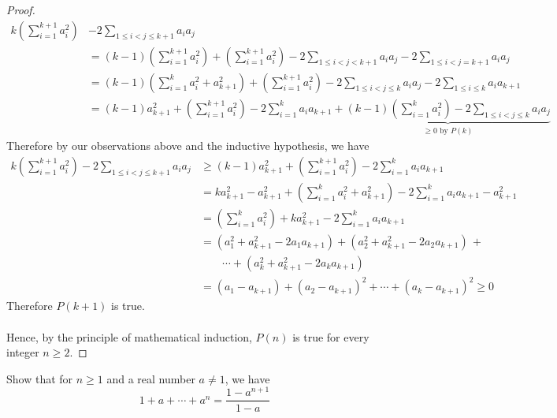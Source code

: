 \begin{proof}
\begin{align*}
k\left(\sum_{i=1}^{k+1} a_i^2 \right)& - 2 \sum_{1\leq i < j \leq k+1}a_ia_j\\[1em]
 &= (k-1)\left(\sum_{i=1}^{k+1} a_i^2 \right) + \left(\sum_{i=1}^{k+1} a_i^2 \right) - 2 \sum_{1\leq i < j < k+1}a_ia_j - 2 \sum_{1\leq i < j = k+1}a_ia_j\\[1em]
 &= (k-1)\left(\sum_{i=1}^{k} a_i^2 + a_{k+1}^2 \right) + \left(\sum_{i=1}^{k+1} a_i^2 \right) - 2 \sum_{1\leq i < j \leq k}a_ia_j - 2 \sum_{1\leq i \leq k}a_ia_{k+1}\\[1em]
 &= (k-1)a_{k+1}^2 + \left(\sum_{i=1}^{k+1} a_i^2 \right) - 2 \sum_{i=1}^{k}a_ia_{k+1} + \underbrace{(k-1)\left(\sum_{i=1}^{k} a_i^2 \right)- 2 \sum_{1\leq i < j \leq k}a_ia_j}_{\text{$\geq 0$ by $P(k)$}}
\end{align*}
Therefore by our observations above and the inductive hypothesis, we have
\begin{align*}
k\left(\sum_{i=1}^{k+1} a_i^2 \right) - 2 \sum_{1\leq i < j \leq k+1}a_ia_j & \geq (k-1)a_{k+1}^2 + \left(\sum_{i=1}^{k+1} a_i^2 \right) - 2 \sum_{i=1}^{k}a_ia_{k+1}\\[1em]
 &= ka_{k+1}^2 - a_{k+1}^2 + \left(\sum_{i=1}^{k} a_i^2 + a_{k+1}^2 \right) - 2 \sum_{i=1}^{k}a_ia_{k+1} - a_{k+1}^2\\[1em]
 &= \left(\sum_{i=1}^{k} a_i^2 \right)+ka_{k+1}^2 - 2 \sum_{i=1}^{k}a_ia_{k+1}\\[1em]
 &= (a_1^2 + a_{k+1}^2 - 2a_1a_{k+1}) + (a_2^2 + a_{k+1}^2 - 2a_2a_{k+1}) \,+\\ &\qquad\cdots + (a_k^2 + a_{k+1}^2 - 2a_ka_{k+1})\\[1em]
 &= (a_1 - a_{k+1}) + (a_2 - a_{k+1})^2 + \cdots + (a_k - a_{k+1})^2 \geq 0
\end{align*}
Therefore $P(k+1)$ is true.\\
\\
Hence, by the principle of mathematical induction, $P(n)$ is true for every integer $n \geq 2$.
\end{proof}

\vspace*{1em}

\begin{example}\label{geom-sum}
Show that for $n \geq 1$ and a real number $a \neq 1$, we have
\[1 + a + \cdots + a^n = \frac{1 - a^{n+1}}{1 - a}\]
\end{example}

\vspace*{1em}

